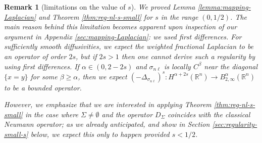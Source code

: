 \documentclass{amsart}
\newcommand{\snl}{{\sigma_{n\ell}}}
\def\R{{\mathbb R}}
\theoremstyle{plain}
\newtheorem{remark}{Remark}
\numberwithin{equation}{section}
\numberwithin{table}{section}
\numberwithin{figure}{section}
\numberwithin{theorem}{section}
\numberwithin{corollary}{section}
\numberwithin{definition}{section}
\numberwithin{lemma}{section}
\numberwithin{proposition}{section}
\numberwithin{remark}{section}
\begin{document}
\begin{remark}[limitations on the value of $s$]
We proved Lemma \ref{lemma:mapping-Laplacian} and Theorem \ref{thm:reg-nl-s-small} for $s$ in the range $(0,1/2)$. The main reason behind this limitation becomes apparent upon inspection of our argument in Appendix \ref{sec:mapping-Laplacian}: we used first differences. For sufficiently smooth diffusivities, we expect the weighted fractional Laplacian to be an operator of order $2s$, but if $2s > 1$ then one cannot derive such a regularity by using first differences. If $\alpha \in (0, 2-2s)$ and $\snl$ is locally $C^\beta$ near the diagonal $\{x = y\}$ for some $\beta \ge \alpha$, then we expect $(-\Delta_\snl)^s \colon H^{\alpha+2s} (\R^n) \to B^{\alpha}_{2,\infty}(\R^n)$ to be a bounded operator.

However, we emphasize that we are interested in applying Theorem \ref{thm:reg-nl-s-small} in the case where $\Sigma \neq \emptyset$ and the operator $D_\Sigma$ coincides with the classical Neumann operator; as we already anticipated, and show in Section \ref{sec:regularity-small-s} below, we expect this only to happen provided $s<1/2$.
 \end{remark}


\end{document}
